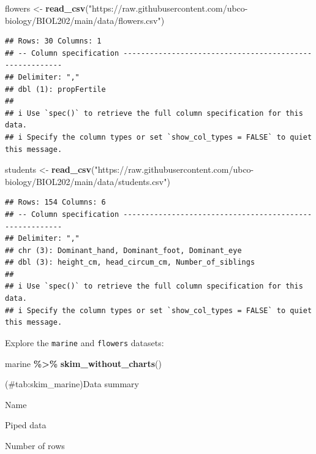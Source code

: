 \documentclass[
]{book}
\newenvironment{Shaded}{\begin{snugshade}}{\end{snugshade}}
\newcommand{\FunctionTok}[1]{\textcolor[rgb]{0.13,0.29,0.53}{\textbf{#1}}}
\newcommand{\NormalTok}[1]{#1}
\newcommand{\OtherTok}[1]{\textcolor[rgb]{0.56,0.35,0.01}{#1}}
\newcommand{\SpecialCharTok}[1]{\textcolor[rgb]{0.81,0.36,0.00}{\textbf{#1}}}
\newcommand{\StringTok}[1]{\textcolor[rgb]{0.31,0.60,0.02}{#1}}
\begin{document}
\begin{Shaded}
\begin{Highlighting}[]
\NormalTok{flowers }\OtherTok{\textless{}{-}} \FunctionTok{read\_csv}\NormalTok{(}\StringTok{"https://raw.githubusercontent.com/ubco{-}biology/BIOL202/main/data/flowers.csv"}\NormalTok{)}
\end{Highlighting}
\end{Shaded}

\begin{verbatim}
## Rows: 30 Columns: 1
## -- Column specification --------------------------------------------------------
## Delimiter: ","
## dbl (1): propFertile
## 
## i Use `spec()` to retrieve the full column specification for this data.
## i Specify the column types or set `show_col_types = FALSE` to quiet this message.
\end{verbatim}

\begin{Shaded}
\begin{Highlighting}[]
\NormalTok{students }\OtherTok{\textless{}{-}} \FunctionTok{read\_csv}\NormalTok{(}\StringTok{"https://raw.githubusercontent.com/ubco{-}biology/BIOL202/main/data/students.csv"}\NormalTok{)}
\end{Highlighting}
\end{Shaded}

\begin{verbatim}
## Rows: 154 Columns: 6
## -- Column specification --------------------------------------------------------
## Delimiter: ","
## chr (3): Dominant_hand, Dominant_foot, Dominant_eye
## dbl (3): height_cm, head_circum_cm, Number_of_siblings
## 
## i Use `spec()` to retrieve the full column specification for this data.
## i Specify the column types or set `show_col_types = FALSE` to quiet this message.
\end{verbatim}

Explore the \texttt{marine} and \texttt{flowers} datasets:

\begin{Shaded}
\begin{Highlighting}[]
\NormalTok{marine }\SpecialCharTok{\%\textgreater{}\%}
  \FunctionTok{skim\_without\_charts}\NormalTok{()}
\end{Highlighting}
\end{Shaded}

(\#tab:skim\_marine)Data summary

Name

Piped data

Number of rows
\end{document}
